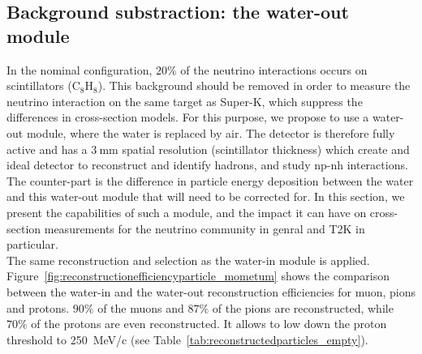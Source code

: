 \subsection{Background substraction: the water-out module}
In the nominal configuration, $20\%$ of the neutrino interactions occurs on scintillators (C$_{8}$H$_{8}$). This background should be removed in order to measure the neutrino interaction on the same target as Super-K, which suppress the differences in cross-section models. For this purpose, we propose to use a water-out module, where the water is replaced by air. The detector is therefore fully active and has a $3~$mm spatial resolution (scintillator thickness) which create and ideal detector to reconstruct and identify hadrons, and study np-nh interactions. The counter-part is the difference in particle energy deposition between the water and this water-out module that will need to be corrected for. In this section, we present the capabilities of such a module, and the impact it can have on cross-section measurements for the neutrino community in genral and T2K in particular.\\
The same reconstruction and selection as the water-in module is applied. Figure~\ref{fig:reconstructionefficiencyparticle_mometum} shows the comparison between the water-in and the water-out reconstruction efficiencies for muon, pions and protons. $90\%$ of the muons and $87\%$ of the pions are reconstructed, while $70\%$ of the protons are even reconstructed. It allows to low down the proton threshold to 250~MeV/c (see Table~\ref{tab:reconstructedparticles_empty}).     
